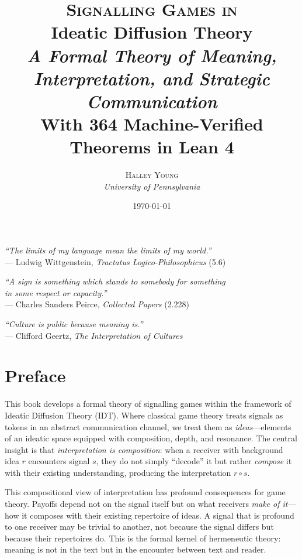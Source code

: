 \documentclass[11pt,twoside]{book}
\title{
  \vspace{-2cm}
  {\LARGE\textsc{Signalling Games in}}\\[0.3cm]
  {\Huge\textbf{Ideatic Diffusion Theory}}\\[0.5cm]
  {\large\textit{A Formal Theory of Meaning, Interpretation, and Strategic Communication}}\\[1cm]
  {\normalsize With 364 Machine-Verified Theorems in Lean 4}
}
\author{
  \textsc{Halley Young}\\[0.3cm]
  \small\textit{University of Pennsylvania}
}
\date{\today}
\theoremstyle{plain}
\theoremstyle{definition}
\theoremstyle{remark}
\newcommand{\compose}{\circ}           %
\begin{document}
\frontmatter
\maketitle

\newpage
\thispagestyle{empty}
\vspace*{3cm}
\begin{center}
\textit{``The limits of my language mean the limits of my world.''}\\[0.3cm]
--- Ludwig Wittgenstein, \textit{Tractatus Logico-Philosophicus} (5.6)
\vspace{2cm}

\textit{``A sign is something which stands to somebody for something\\
in some respect or capacity.''}\\[0.3cm]
--- Charles Sanders Peirce, \textit{Collected Papers} (2.228)
\vspace{2cm}

\textit{``Culture is public because meaning is.''}\\[0.3cm]
--- Clifford Geertz, \textit{The Interpretation of Cultures}
\end{center}

\chapter*{Preface}

This book develops a formal theory of signalling games within the framework
of Ideatic Diffusion Theory (IDT). Where classical game theory treats
signals as tokens in an abstract communication channel, we treat them
as \emph{ideas}---elements of an ideatic space equipped with composition,
depth, and resonance. The central insight is that \emph{interpretation
is composition}: when a receiver with background idea $r$ encounters
signal $s$, they do not simply ``decode'' it but rather \emph{compose}
it with their existing understanding, producing the interpretation
$r \compose s$.

This compositional view of interpretation has profound consequences for
game theory. Payoffs depend not on the signal itself but on what
receivers \emph{make of it}---how it composes with their existing repertoire
of ideas. A signal that is profound to one receiver may be trivial to
another, not because the signal differs but because their repertoires do.
This is the formal kernel of hermeneutic theory: meaning is not in the
text but in the encounter between text and reader.
\end{document}

